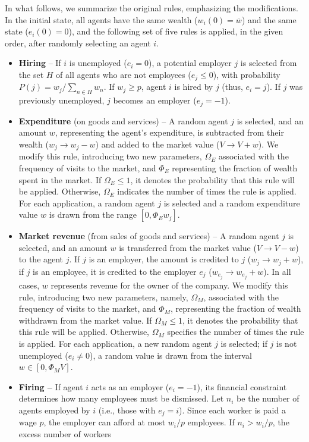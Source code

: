 In what follows, we summarize the original rules, emphasizing the modifications. In the initial state, all agents have the same wealth ($w_{i}(0)=\overline{w}$) and the same state ($e_{i}(0)=0$), and the following set of five rules is applied, in the given order, after randomly selecting an agent $i$.
\begin{itemize}
\item \textbf{Hiring} -- If $i$ is unemployed ($e_{i}=0$), a potential employer $j$ is selected from the set $H$ of all agents who are not employees ($e_{j}\leq0$), with probability $P(j)=w_{j}/\sum_{n\in H}w_{n}$. If $w_{j}\ge p$, agent $i$ is hired by $j$ (thus, $e_{i}=j$). If $j$ was previously unemployed, $j$ becomes an employer ($e_{j}=-1$).
\item \textbf{Expenditure} (on goods and services) -- A random agent $j$ is selected, and an amount $w$, representing the agent's expenditure, is subtracted from their wealth ($w_{j}\to w_{j}-w$) and added to the market value ($V\to V+w$). We modify this rule, introducing two new parameters, $\Omega_{E}$ associated with the frequency of visits to the market, and $\Phi_{E}$ representing the fraction of wealth spent in the market. If $\Omega_{E}\leq1$, it denotes the probability that this rule will be applied. Otherwise, $\Omega_{E}$ indicates the number of times the rule is applied. For each application, a random agent $j$ is selected and a random expenditure value $w$ is drawn from the range $\left[0,\Phi_{E}w_{j}\right]$.
\item \textbf{Market revenue} (from sales of goods and services) -- A random agent $j$ is selected, and an amount $w$ is transferred from the market value ($V\to V-w$) to the agent $j$. If $j$ is an employer, the amount is credited to $j$ ($w_{j}\to w_{j}+w$), if $j$ is an employee, it is credited to the employer $e_{j}$ ($w_{e_{j}}\to w_{e_{j}}+w$). In all cases, $w$ represents revenue for the owner of the company. We modify this rule, introducing two new parameters, namely, $\Omega_{M}$, associated with the frequency of visits to the market, and $\Phi_{M}$, representing the fraction of wealth withdrawn from the market value. If $\Omega_{M}\leq1$, it denotes the probability that this rule will be applied. Otherwise, $\Omega_{M}$ specifies the number of times the rule is applied. For each application, a new random agent $j$ is selected; if $j$ is not unemployed ($e_{i}\neq0$), a random value is drawn from the interval $w\in[0,\Phi_{M}V]$.
\item \textbf{Firing --} If agent $i$ acts as an employer ($e_{i}=-1$), its financial constraint determines how many employees must be dismissed. Let $n_{i}$ be the number of agents employed by $i$ (i.e., those with $e_{j}=i$). Since each worker is paid a wage $p$, the employer can afford at most $w_{i}/p$ employees. If $n_{i}>w_{i}/p$, the excess number of workers 

\end{itemize}
